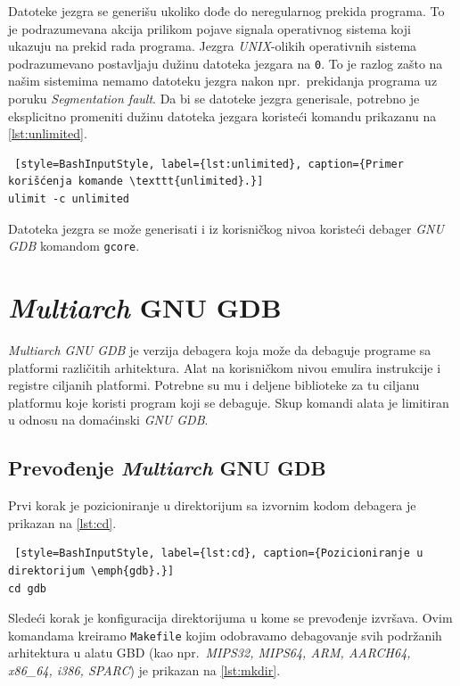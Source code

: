 \documentclass[12pt,oneside]{memoir}
\begin{document}
Datoteke jezgra se generišu ukoliko dođe do neregularnog prekida programa. To je podrazumevana akcija prilikom pojave signala operativnog sistema koji ukazuju na prekid rada programa. Jezgra \emph{UNIX}-olikih operativnih sistema podrazumevano postavljaju dužinu datoteka jezgara na \texttt{0}. To je razlog zašto na našim sistemima nemamo datoteku jezgra nakon npr.~prekidanja programa uz poruku \emph{Segmentation fault}. Da bi se datoteke jezgra generisale, potrebno je eksplicitno promeniti dužinu datoteka jezgara koristeći komandu prikazanu na \ref{lst:unlimited}.

\begin{lstlisting} [style=BashInputStyle, label={lst:unlimited}, caption={Primer korišćenja komande \texttt{unlimited}.}]
ulimit -c unlimited

\end{lstlisting}

Datoteka jezgra se može generisati i iz korisničkog nivoa koristeći debager \emph{GNU GDB} komandom \texttt{gcore}.

\section{\emph{Multiarch} GNU GDB}

\emph{Multiarch GNU GDB} je verzija debagera koja može da debaguje programe sa platformi različitih arhitektura. Alat na korisničkom nivou emulira instrukcije i registre ciljanih platformi. Potrebne su mu i deljene biblioteke za tu ciljanu platformu koje koristi program koji se debaguje. Skup komandi alata je limitiran u odnosu na domaćinski \emph{GNU GDB}.

\subsection{Prevođenje \emph{Multiarch} GNU GDB}

Prvi korak je pozicioniranje u direktorijum sa izvornim kodom debagera je prikazan na \ref{lst:cd}.
\begin{lstlisting} [style=BashInputStyle, label={lst:cd}, caption={Pozicioniranje u direktorijum \emph{gdb}.}]
cd gdb

\end{lstlisting}

Sledeći korak je konfiguracija direktorijuma u kome se prevođenje izvršava. Ovim komandama kreiramo \texttt{Makefile} kojim odobravamo debagovanje svih podržanih arhitektura u alatu GBD (kao npr.~\emph{MIPS32, MIPS64, ARM, AARCH64, x86\_64, i386, SPARC}) je prikazan na \ref{lst:mkdir}.
\end{document}
